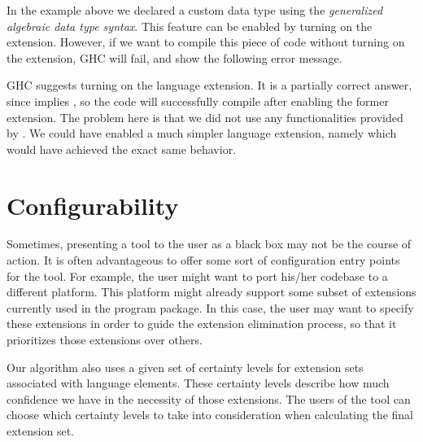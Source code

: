 \documentclass[main.tex]{subfiles}
\begin{document}
	\noindent
	In the example above we declared a custom data type using the \emph{generalized algebraic data type syntax}. This feature can be enabled by turning on the  extension. However, if we want to compile this piece of code without turning on the extension, GHC will fail, and show the following error message.
	
	\begin{oneLineHaskell}
	\end{oneLineHaskell}
	
	\noindent
	GHC suggests turning on the  language extension. It is a partially correct answer, since  implies , so the code will successfully compile after enabling the former extension. The problem here is that we did not use any functionalities provided by . We could have enabled a much simpler language extension, namely  which would have achieved the exact same behavior.
	
	
	\section{Configurability}
	
	Sometimes, presenting a tool to the user as a black box may not be the course of action. It is often advantageous to offer some sort of configuration entry points for the tool. For example, the user might want to port his/her codebase to a different platform. This platform might already support some subset of extensions currently used in the program package. In this case, the user may want to specify these extensions in order to guide the extension elimination process, so that it prioritizes those extensions over others.
	
	Our algorithm also uses a given set of certainty levels for extension sets associated with language elements. These certainty levels describe how much confidence we have in the necessity of those extensions. The users of the tool can choose which certainty levels to take into consideration when calculating the final extension set.
	
\end{document}
